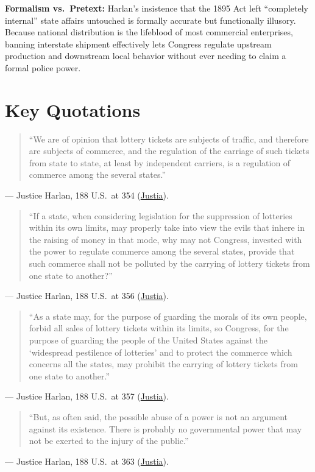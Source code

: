\documentclass[12pt]{article}
\begin{document}
\textbf{Formalism vs.\ Pretext:} Harlan's insistence that the 1895 Act left ``completely internal'' state affairs untouched is formally accurate but functionally illusory. Because national distribution is the lifeblood of most commercial enterprises, banning interstate shipment effectively lets Congress regulate upstream production and downstream local behavior without ever needing to claim a formal police power.

\section{Key Quotations}
\begin{quote}
``We are of opinion that lottery tickets are subjects of traffic, and therefore are subjects of commerce, and the regulation of the carriage of such tickets from state to state, at least by independent carriers, is a regulation of commerce among the several states.''
\end{quote}
\noindent --- Justice Harlan, 188 U.S.\ at 354 (\href{https://supreme.justia.com/cases/federal/us/188/321/}{Justia}).

\begin{quote}
``If a state, when considering legislation for the suppression of lotteries within its own limits, may properly take into view the evils that inhere in the raising of money in that mode, why may not Congress, invested with the power to regulate commerce among the several states, provide that such commerce shall not be polluted by the carrying of lottery tickets from one state to another?''
\end{quote}
\noindent --- Justice Harlan, 188 U.S.\ at 356 (\href{https://supreme.justia.com/cases/federal/us/188/321/}{Justia}).

\begin{quote}
``As a state may, for the purpose of guarding the morals of its own people, forbid all sales of lottery tickets within its limits, so Congress, for the purpose of guarding the people of the United States against the `widespread pestilence of lotteries' and to protect the commerce which concerns all the states, may prohibit the carrying of lottery tickets from one state to another.''
\end{quote}
\noindent --- Justice Harlan, 188 U.S.\ at 357 (\href{https://supreme.justia.com/cases/federal/us/188/321/}{Justia}).

\begin{quote}
``But, as often said, the possible abuse of a power is not an argument against its existence. There is probably no governmental power that may not be exerted to the injury of the public.''
\end{quote}
\noindent --- Justice Harlan, 188 U.S.\ at 363 (\href{https://supreme.justia.com/cases/federal/us/188/321/}{Justia}).
\end{document}
